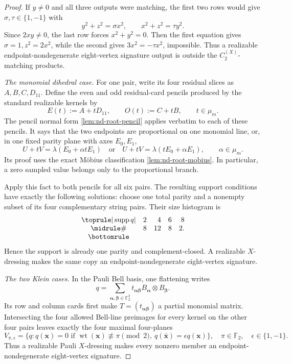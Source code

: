 \documentclass[11pt,letterpaper,onecolumn]{article}
\theoremstyle{plain}
\theoremstyle{definition}
\theoremstyle{remark}
\newcommand{\Ftwo}{\mathbb F_2}
\newcommand{\CycX}[1]{{C_{#1}^{(X)}}}
\newcommand{\wt}{\operatorname{wt}}
\newcommand{\supp}{\operatorname{supp}}
\begin{document}
\begin{proof}
If \(y\ne0\) and all three outputs were matching, the first two rows would
give \(\sigma,\tau\in\{1,-1\}\) with
\begin{equation*}
 y^2+z^2=\sigma x^2,
 \qquad
 x^2+z^2=\tau y^2.
\end{equation*}
Since \(2xy\ne0\), the last row forces \(x^2+y^2=0\).  Then the first
equation gives \(\sigma=1,z^2=2x^2\), while the second gives
\(3x^2=-\tau x^2\), impossible.  Thus a realizable endpoint-nondegenerate eight-vertex signature output is outside the
\(\CycX{2}\)-matching products.

\emph{The monomial dihedral case.}
For one pair, write its four residual slices as \(A,B,C,D_{11}\).  Define the
even and odd residual-card pencils produced by the standard realizable kernels by
\[
 E(t):=A+tD_{11},\qquad O(t):=C+tB,\qquad t\in\mu_m.
\]
The pencil normal form \cref{lem:nd-root-pencil} applies verbatim to
each of these pencils.  It says that the two endpoints are proportional on
one monomial line, or, in one fixed parity plane with axes \(E_0,E_1\),
\[
 U+tV=\lambda(E_0+\alpha tE_1)
 \quad\text{or}\quad
 U+tV=\lambda(tE_0+\alpha E_1),
 \qquad \alpha\in\mu_m.
\]
Its proof uses the exact M\"obius classification
\cref{lem:nd-root-mobius}. In particular, a zero sampled value belongs only
to the proportional branch.

Apply this fact to both pencils for all six pairs.  The resulting support
conditions have exactly the following solutions: choose one total parity
and a nonempty subset of its four complementary string pairs.  Their size
histogram is
\begin{equation}
\begin{array}{crrrr}
\toprule
 |\supp q|&2&4&6&8\\ \midrule
 \#&8&12&8&2.\\
\bottomrule
\end{array}
\label{eq:equality-q4-monomial-supports}
\end{equation}
Hence the support is already one parity and complement-closed.  A realizable
\(X\)-dressing makes the same copy an endpoint-nondegenerate eight-vertex signature.

\emph{The two Klein cases.}
In the Pauli Bell basis, one flattening writes
\[
 q=\sum_{{\boldsymbol{\alpha}},{\boldsymbol{\beta}}\in\Ftwo^2}
 t_{{\boldsymbol{\alpha}}{\boldsymbol{\beta}}}B_{\boldsymbol{\alpha}}\otimes B_{\boldsymbol{\beta}}.
\]
Its row and column cards first make \(T=(t_{{\boldsymbol{\alpha}}{\boldsymbol{\beta}}})\) a partial
monomial matrix.  Intersecting the four allowed Bell-line preimages for
every kernel on the other four pairs leaves exactly the four maximal
four-planes
\begin{equation}
 V_{\pi,\epsilon}
 =\{q:q({\mathbf{x}})=0\text{ if }\wt({\mathbf{x}})\not\equiv\pi\pmod2,\
          q(\bar {\mathbf{x}})=\epsilon q({\mathbf{x}})\},
 \quad \pi\in\Ftwo,\quad\epsilon\in\{1,-1\}.
 \label{eq:equality-q4-pauli-planes}
\end{equation}
Thus a realizable Pauli \(X\)-dressing makes every nonzero member an endpoint-nondegenerate eight-vertex signature.


\end{proof}
\end{document}
